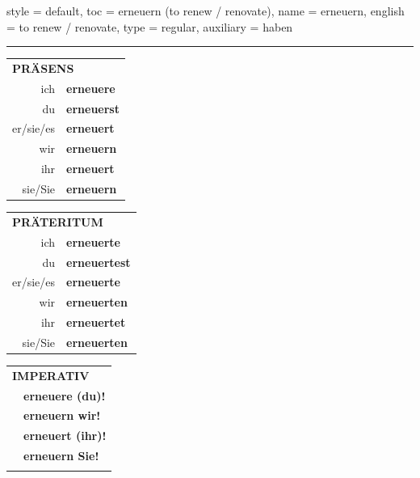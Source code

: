 \begin{verbentry}{
  style = {default},
  toc = {erneuern (to renew / renovate)},
  name = {erneuern},
  english = {to renew / renovate},
  type = {regular},
  auxiliary = {haben}
}
 
    
     \vspace{5pt}

    \hrule
    
    \vspace{5pt}

  \begin{tabular}{rl}
     \multicolumn{2}{l}{\textbf{PRÄSENS} }\\
    ich & \textbf{erneuere}\\
    du & \textbf{erneuerst}\\
    er/sie/es & \textbf{erneuert}\\
    wir & \textbf{erneuern}\\
    ihr & \textbf{erneuert}\\
    sie/Sie & \textbf{erneuern}\\
  \end{tabular}
  \hfill
  \begin{tabular}{rl}
    \multicolumn{2}{l}{\textbf{PRÄTERITUM} }\\
    ich & \textbf{erneuerte}\\
    du & \textbf{erneuertest}\\
    er/sie/es & \textbf{erneuerte}\\
    wir & \textbf{erneuerten}\\
    ihr & \textbf{erneuertet}\\
    sie/Sie & \textbf{erneuerten}\\
  \end{tabular}
  \hfill
  \begin{tabular}{rl}
     \multicolumn{2}{l}{\textbf{IMPERATIV} }\\
   & \textbf{erneuere (du)!}\\
   & \textbf{erneuern wir!}\\
   & \textbf{erneuert (ihr)!}\\
   & \textbf{erneuern Sie!}\\
   & \vspace{10pt}
  \end{tabular}

 \vspace{10pt}


\end{verbentry}
